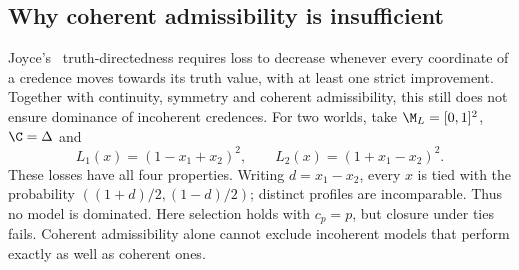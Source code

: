 \subsection{Why coherent admissibility is insufficient}
Joyce's~\cite{Joyce} truth-directedness requires loss to decrease whenever every coordinate of a credence moves towards its truth value, with at least one strict improvement. Together with continuity, symmetry and coherent admissibility, this still does not ensure dominance of incoherent credences. For two worlds, take $\M_L=[0,1]^2$, $\C=\Delta$ and
\[
L_1(x)=(1-x_1+x_2)^2,\qquad L_2(x)=(1+x_1-x_2)^2.
\]
These losses have all four properties. Writing $d=x_1-x_2$, every $x$ is tied with the probability $((1+d)/2,(1-d)/2)$; distinct profiles are incomparable. Thus no model is dominated. Here selection holds with $c_p=p$, but closure under ties fails. Coherent admissibility alone cannot exclude incoherent models that perform exactly as well as coherent ones.
